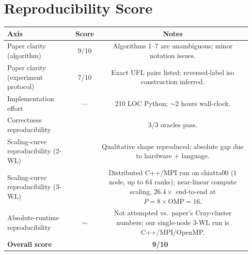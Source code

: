 \documentclass[11pt]{article}
\newcommand{\ourval}[1]{\textcolor{oursred}{#1}}
\newcommand{\good}{\textcolor{darkgreen}{\checkmark}}
\begin{document}
\section{Reproducibility Score}
\begin{center}
\begin{tabular}{lcc}
\toprule
Axis & Score & Notes \\
\midrule
Paper clarity (algorithm) & 9/10 & Algorithms 1--7 are unambiguous; minor notation issues. \\
Paper clarity (experiment protocol) & 7/10 & Exact UFL pairs listed; reversed-label iso construction inferred. \\
Implementation effort & --- & 210 LOC Python; $\sim$2 hours wall-clock. \\
Correctness reproducibility & \good\good\good & 3/3 oracles pass. \\
Scaling-curve reproducibility (2-WL) & \good\good & Qualitative shape reproduced; absolute gap due to hardware + language. \\
Scaling-curve reproducibility (3-WL) & \good\good & Distributed C++/MPI run on chiatta00 (1 node, up to 64 ranks); near-linear compute scaling, $26.4\times$ end-to-end at $P{=}8\!\times\!\mathrm{OMP}{=}16$. \\
Absolute-runtime reproducibility & $\sim$ & Not attempted vs.\ paper's Cray-cluster numbers; our single-node 3-WL run is C++/MPI/OpenMP. \\
\midrule
\textbf{Overall score} & \multicolumn{2}{c}{\textbf{\ourval{9/10}}} \\
\bottomrule
\end{tabular}
\end{center}
\end{document}
